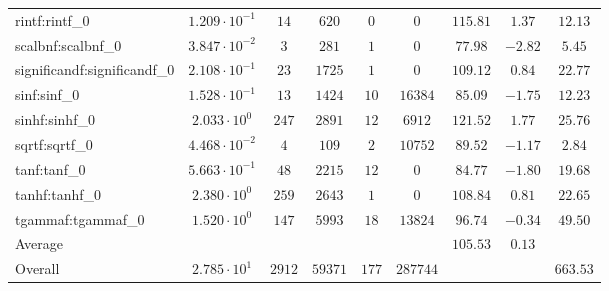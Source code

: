 \begin{tabular}{|l|c|c|c|c|c|c|c|c|}
rintf:rintf\_0               & $ 1.209 \cdot 10^{-1} $ & $ 14     $ & $ 620   $ & $ 0   $ & $ 0      $ & $ 115.81      $ & $ 1.37    $ & $ 12.13   $ \\
scalbnf:scalbnf\_0           & $ 3.847 \cdot 10^{-2} $ & $ 3      $ & $ 281   $ & $ 1   $ & $ 0      $ & $ 77.98       $ & $ -2.82   $ & $ 5.45    $ \\
significandf:significandf\_0 & $ 2.108 \cdot 10^{-1} $ & $ 23     $ & $ 1725  $ & $ 1   $ & $ 0      $ & $ 109.12      $ & $ 0.84    $ & $ 22.77   $ \\
sinf:sinf\_0                 & $ 1.528 \cdot 10^{-1} $ & $ 13     $ & $ 1424  $ & $ 10  $ & $ 16384  $ & $ 85.09       $ & $ -1.75   $ & $ 12.23   $ \\
sinhf:sinhf\_0               & $ 2.033 \cdot 10^{0}  $ & $ 247    $ & $ 2891  $ & $ 12  $ & $ 6912   $ & $ 121.52      $ & $ 1.77    $ & $ 25.76   $ \\
sqrtf:sqrtf\_0               & $ 4.468 \cdot 10^{-2} $ & $ 4      $ & $ 109   $ & $ 2   $ & $ 10752  $ & $ 89.52       $ & $ -1.17   $ & $ 2.84    $ \\
tanf:tanf\_0                 & $ 5.663 \cdot 10^{-1} $ & $ 48     $ & $ 2215  $ & $ 12  $ & $ 0      $ & $ 84.77       $ & $ -1.80   $ & $ 19.68   $ \\
tanhf:tanhf\_0               & $ 2.380 \cdot 10^{0}  $ & $ 259    $ & $ 2643  $ & $ 1   $ & $ 0      $ & $ 108.84      $ & $ 0.81    $ & $ 22.65   $ \\
tgammaf:tgammaf\_0           & $ 1.520 \cdot 10^{0}  $ & $ 147    $ & $ 5993  $ & $ 18  $ & $ 13824  $ & $ 96.74       $ & $ -0.34   $ & $ 49.50   $ \\
\hline
Average                      & $                     $ & $        $ & $       $ & $     $ & $        $ & $ 105.53      $ & $ 0.13    $ & $         $ \\
\hline
Overall                      & $ 2.785 \cdot 10^{1}  $ & $ 2912   $ & $ 59371 $ & $ 177 $ & $ 287744 $ & $             $ & $         $ & $ 663.53  $ \\
\hline
\end{tabular}
